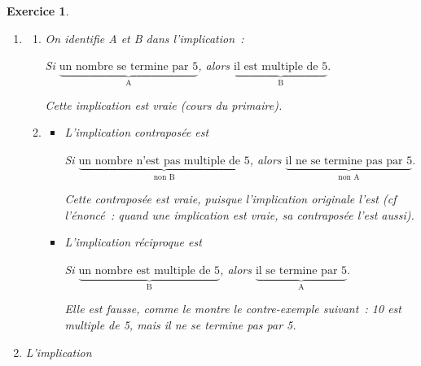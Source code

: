 \documentclass[10pt]{article}
\newtheorem{exo}{Exercice}
\begin{document}
\begin{exo}%


\begin{enumerate}
\item \begin{enumerate}
\item On identifie A et B dans l'implication~:

\begin{center}

Si $\underbrace{\text{un nombre se termine par 5}}_{\text{A}}$, alors $\underbrace{\text{il est multiple de 5}}_{\text{B}}.$

\end{center}

Cette implication est vraie (cours du primaire).

\item

\begin{itemize}
\item[\textbullet] L'implication contraposée est

\begin{center}

Si $\underbrace{\text{un nombre n'est pas multiple de 5}}_{\text{non B}}$, alors $\underbrace{\text{il ne se termine pas par 5}}_{\text{non A}}.$

\end{center}

Cette contraposée est vraie, puisque l'implication originale l'est (cf l'énoncé~: quand une implication est vraie, sa contraposée l'est aussi).

\medskip

\item[\textbullet] L'implication réciproque est

\begin{center}

Si $\underbrace{\text{un nombre est multiple de 5}}_{\text{B}}$, alors $\underbrace{\text{il se termine par 5}}_{\text{A}}.$

\end{center}

Elle est fausse, comme le montre le contre-exemple suivant~: 10 est multiple de 5, mais il ne se termine pas par 5.
\end{itemize}

\end{enumerate}
\item L'implication

\begin{center}


\end{center}
\end{enumerate}
\end{exo}
\end{document}
